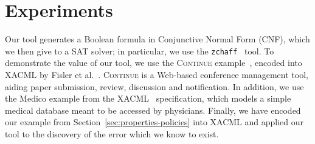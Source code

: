 \section{Experiments}
\label{sec:experiments}

Our tool generates a Boolean formula in Conjunctive Normal Form (CNF),
which we then give to a SAT solver; in particular, we use the
\texttt{zchaff}~\cite{moskewicz01chaff} tool.  To demonstrate the
value of our tool, we use the \textsc{Continue}
example~\cite{krishnamurthi03continue}, encoded into XACML by Fisler
et al.~\cite{fisler05}.  \textsc{Continue} is a Web-based conference
management tool, aiding paper submission, review, discussion and
notification.  In addition, we use the Medico example from the
XACML~\cite{xacml} specification, which models a simple medical
database meant to be accessed by physicians.  Finally, we have encoded
our example from Section~\ref{sec:properties-policies} into XACML and
applied our tool to the discovery of the error which we know to exist.

